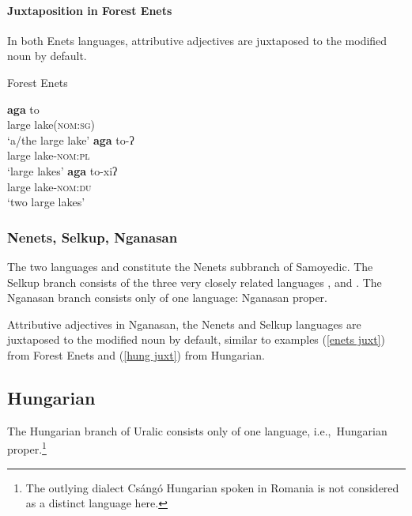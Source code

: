 \paragraph*{Juxtaposition in Forest Enets}
In both Enets languages, attributive adjectives are juxtaposed to the modified noun by default.
\begin{exe}
\label{enets juxt}
\ex \rm{Forest Enets  \citep[71]{siegl2013a}}
\begin{xlist}
\ex 
\gll	\textbf{aga} to\\
	large lake(\textsc{nom:sg})\\
\glt	‘a/the large lake’
\ex 
\gll	\textbf{aga} to-ʔ\\
	large lake\textsc{-nom:pl}\\
\glt	‘large lakes’
\ex 
\gll	\textbf{aga} to-xiʔ\\
	large lake\textsc{-nom:du}\\
\glt	‘two large lakes’
\end{xlist}
\end{exe}

\subsubsection{Nenets, Selkup, Nganasan}
The two languages  and  constitute the Nenets subbranch of Samoyedic. The Selkup branch consists of the three very closely related languages ,  and . The Nganasan branch consists only of one language: Nganasan proper.

Attributive adjectives in Nganasan, the Nenets and Selkup languages are juxtaposed to the modified noun by default, similar to examples (\ref{enets juxt}) from Forest Enets and (\ref{hung juxt}) from Hungarian.

\subsection{Hungarian}
The Hungarian branch of Uralic consists only of one language, i.e.,~Hungarian proper.\footnote{The outlying dialect Csángó Hungarian spoken in Romania is not considered as a distinct language here.}

